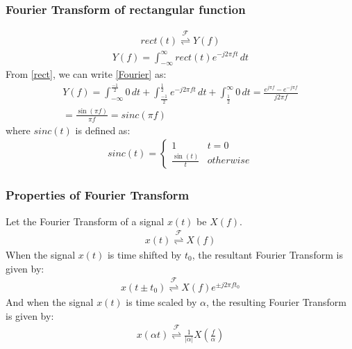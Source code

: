 \documentclass{beamer}
\providecommand{\brak}[1]{\ensuremath{\left(#1\right)}}
\providecommand{\fourier}{\overset{\mathcal{F}}{ \rightleftharpoons}}
\providecommand{\abs}[1]{\left\vert#1\right\vert}
\begin{document}
\begin{frame}
    \frametitle{Fourier Transform of rectangular function}
    \begin{flushleft}
    \begin{align}
    rect(t) \fourier Y(f)
    \end{align}
    \begin{align}
    Y(f) = \int_{-\infty}^\infty rect(t)e^{-j2\pi f t}\,dt
    \label{Fourier}
\end{align}
From \eqref{rect}, we can write \eqref{Fourier} as:
\begin{align}
   Y(f) = \int_{-\infty}^\frac{-1}{2} 0\,dt + \int_{\frac{-1}{2}}^\frac{1}{2} e^{-j2\pi ft}\,dt + \int_\frac{1}{2}^\infty 0\,dt
    = \frac{e^{j\pi f} - e^{-j \pi f}}{j2\pi f}\\
      = \frac{\sin (\pi f)}{\pi f}
       = sinc(\pi f)
\end{align}
where $sinc(t)$ is defined as:
\begin{align}
    sinc(t) = 
    \begin{cases}
    1 & t = 0\\
    \frac{\sin(t)}{t} & otherwise
    \end{cases}
\end{align}
    \end{flushleft}
\end{frame}
\begin{frame}
    \frametitle{Properties of Fourier Transform}
    \begin{flushleft}
    Let the Fourier Transform of a signal $x(t)$ be $X(f)$.
\begin{align}
    x(t) \fourier X(f)
\end{align}
When the signal $x(t)$ is time shifted by $t_0$, the resultant Fourier Transform is given by:
\begin{align}
    x(t \pm t_0) \fourier X(f)e^{\pm j2\pi ft_0}
    \label{shift}
\end{align}
And when the signal $x(t)$ is time scaled by $\alpha$, the resulting Fourier Transform is given by:
\begin{align}
    x(\alpha t) \fourier \frac{1}{\abs{\alpha}}X\brak{\frac{f}{\alpha}}
    \label{scale}
\end{align}
    \end{flushleft}
\end{frame}
\end{document}
